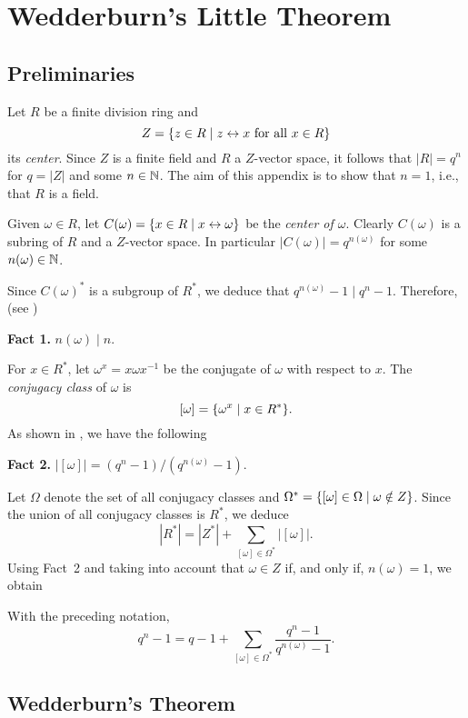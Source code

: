 \chapter{Wedderburn's Little Theorem}

\section{Preliminaries}

Let $R$ be a finite division ring and
\[
    Z=\{z\in R\mid z\mathrel\leftrightarrow x\text{ for all }x\in R\}
\]
its \textsl{center}. Since $Z$ is a finite field and $R$ a $Z$-vector space, it follows that $|R|=q^n$ for $q=|Z|$ and some $n\in\mathbb{N}$. The aim of this appendix is to show that $n=1$, i.e., that $R$ is a field.

Given $\omega\in R$, let $C(\omega)=\{x\in R\mid x\mathrel\leftrightarrow\omega\}$ be the \textsl{center of $\omega$}. Clearly $C(\omega)$ is a subring of $R$ and a $Z$-vector space. In particular $|C(\omega)|=q^{n(\omega)}$ for some $n(\omega)\in\mathbb{N}$.

Since $C(\omega)^*$ is a subgroup of $R^*$, we deduce that $q^{n(\omega)}-1\mid q^n-1$. Therefore, (see \citep[Cyclotomic Polynomials]{LC-Galois})

\textbf{Fact 1.} $n(\omega)\mid n$.

For $x\in R^*$, let $\omega^x=x\omega x^{-1}$ be the conjugate of $\omega$ with respect to $x$. The \textsl{conjugacy class} of $\omega$ is
\[
    [\omega] = \{\omega^x\mid x\in R^*\}.
\]
As shown in \citep[The Fundamental Counting Principle]{LC-Groups}, we have the following

\textbf{Fact 2.} $|[\omega]|=(q^n-1)/(q^{n(\omega)}-1)$.

Let $\Omega$ denote the set of all conjugacy classes and $\Omega^*=\{[\omega]\in\Omega\mid \omega\notin Z\}$. Since the union of all conjugacy classes is $R^*$, we deduce
\[
    |R^*| = |Z^*| + \sum_{[\omega]\in\Omega^*}|[\omega]|.
\]
Using Fact~2 and taking into account that $\omega\in Z$ if, and only if, $n(\omega)=1$, we obtain

\begin{lem}\label{lem:q-equation} With the preceding notation,
    \[
        q^n-1 = q-1 + \sum_{[\omega]\in\Omega^*}\frac{q^n-1}{q^{n(\omega)}-1}.
    \]
\end{lem}

\section{Wedderburn's Theorem}

